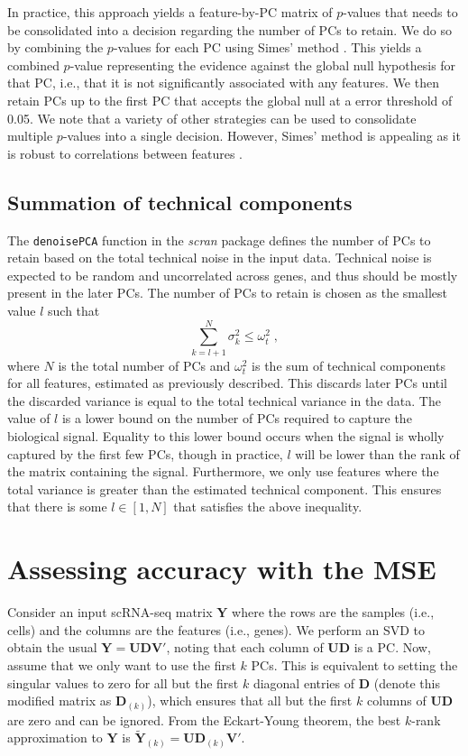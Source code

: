 \documentclass[10pt,letterpaper]{article}
\newcommand\code[1]{{\small\texttt{#1}}}
\begin{document}
In practice, this approach yields a feature-by-PC matrix of $p$-values that needs to be consolidated into a decision regarding the number of PCs to retain. 
We do so by combining the $p$-values for each PC using Simes' method \cite{simes1986improved}.
This yields a combined $p$-value representing the evidence against the global null hypothesis for that PC, 
i.e., that it is not significantly associated with any features.
We then retain PCs up to the first PC that accepts the global null at a error threshold of 0.05.
We note that a variety of other strategies can be used to consolidate multiple $p$-values into a single decision.
However, Simes' method is appealing as it is robust to correlations between features \cite{sarkar1997simes}.

\subsection{Summation of technical components}
The \code{denoisePCA} function in the \textit{scran} package \cite{lun2016stepbystep} defines the number of PCs to retain based on the total technical noise in the input data.
Technical noise is expected to be random and uncorrelated across genes, and thus should be mostly present in the later PCs.
The number of PCs to retain is chosen as the smallest value $l$ such that 
\[
    \sum_{k=l+1}^N \sigma^2_k  \le \omega^2_t \;,
\]
where $N$ is the total number of PCs and $\omega^2_t$ is the sum of technical components for all features, estimated as previously described.
This discards later PCs until the discarded variance is equal to the total technical variance in the data.
The value of $l$ is a lower bound on the number of PCs required to capture the biological signal.
Equality to this lower bound occurs when the signal is wholly captured by the first few PCs,
though in practice, $l$ will be lower than the rank of the matrix containing the signal.
Furthermore, we only use features where the total variance is greater than the estimated technical component.
This ensures that there is some $l \in [1, N]$ that satisfies the above inequality.

\section{Assessing accuracy with the MSE}
Consider an input scRNA-seq matrix $\mathbf{Y}$ where the rows are the samples (i.e., cells) and the columns are the features (i.e., genes).
We perform an SVD to obtain the usual $\mathbf{Y} = \mathbf{U}\mathbf{D}\mathbf{V}'$, noting that each column of $\mathbf{U}\mathbf{D}$ is a PC.
Now, assume that we only want to use the first $k$ PCs.
This is equivalent to setting the singular values to zero for all but the first $k$ diagonal entries of $\mathbf{D}$ (denote this modified matrix as $\mathbf{D}_{(k)}$),
which ensures that all but the first $k$ columns of $\mathbf{U}\mathbf{D}$ are zero and can be ignored.
From the Eckart-Young theorem, the best $k$-rank approximation to $\mathbf{Y}$ is $\mathbf{\tilde Y}_{(k)} =  \mathbf{U}\mathbf{D}_{(k)}\mathbf{V}'$.
\end{document}
